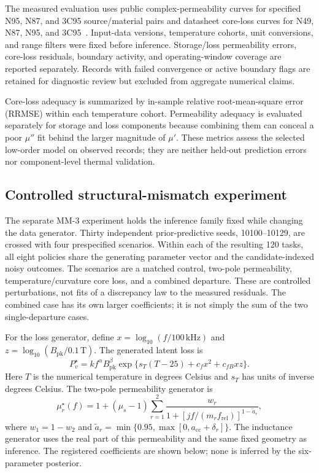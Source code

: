 The measured evaluation uses public complex-permeability curves for
specified N95, N87, and 3C95 source/material pairs and datasheet
core-loss curves for N49, N87, N95, and 3C95~\citep{materialdatabase}.
Input-data versions, temperature cohorts, unit conversions, and range
filters were fixed before inference. Storage/loss permeability errors,
core-loss residuals, boundary activity, and operating-window coverage
are reported separately. Records with failed convergence or active
boundary flags are retained for diagnostic review but excluded from
aggregate numerical claims.

Core-loss adequacy is summarized by in-sample relative root-mean-square
error (RRMSE) within each temperature cohort. Permeability adequacy is
evaluated separately for storage and loss components because combining
them can conceal a poor \(\mu''\) fit behind the larger magnitude of
\(\mu'\). These metrics assess the selected low-order model on observed
records; they are neither held-out prediction errors nor component-level
thermal validation.

\hypertarget{controlled-structural-mismatch-experiment}{%
\subsection{Controlled structural-mismatch
experiment}\label{controlled-structural-mismatch-experiment}}

The separate MM-3 experiment holds the inference family fixed while
changing the data generator. Thirty independent prior-predictive seeds,
10100--10129, are crossed with four prespecified scenarios. Within each
of the resulting 120 tasks, all eight policies share the generating
parameter vector and the candidate-indexed noisy outcomes. The scenarios
are a matched control, two-pole permeability, temperature/curvature core
loss, and a combined departure. These are controlled perturbations, not
fits of a discrepancy law to the measured residuals. The combined case
has its own larger coefficients; it is not simply the sum of the two
single-departure cases.

For the loss generator, define \(x=\log_{10}(f/100\,\mathrm{kHz})\) and
\(z=\log_{10}(B_{\mathrm{pk}}/0.1\,\mathrm T)\). The generated latent
loss is \[P_v^{\star}=k f^\alpha B_{\mathrm{pk}}^\beta
 \exp\{s_T(T-25)+c_f x^2+c_{fB}xz\}.\] Here \(T\) is the numerical
temperature in degrees Celsius and \(s_T\) has units of inverse degrees
Celsius. The two-pole permeability generator is
\[\mu_r^{\star}(f)=1+(\mu_s-1)
 \sum_{r=1}^{2}\frac{w_r}
 {1+[jf/(m_r f_{\mathrm{rel}})]^{1-\widetilde a_r}},\] where
\(w_1=1-w_2\) and
\(\widetilde a_r=\min\{0.95,\max[0,a_{\mathrm{cc}}+\delta_r]\}\). The
inductance generator uses the real part of this permeability and the
same fixed geometry as inference. The registered coefficients are shown
below; none is inferred by the six-parameter posterior.

